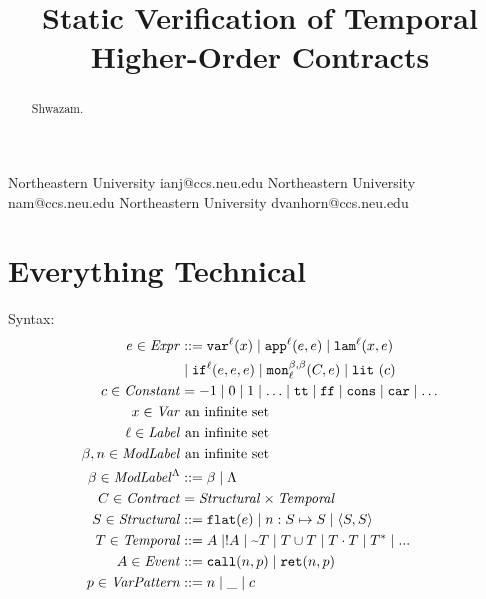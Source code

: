 \documentclass[preprint,onecolumn,9pt]{sigplanconf} %
\begin{document}
\copyrightdata{[to be supplied]}
\title{Static Verification of Temporal Higher-Order Contracts}

           {Northeastern University}
           {ianj@ccs.neu.edu}
           {Northeastern University}
           {nam@ccs.neu.edu}
           {Northeastern University}
           {dvanhorn@ccs.neu.edu}
\maketitle
\begin{abstract}
  Shwazam.
\end{abstract}

\section{Everything Technical}
Syntax:
\begin{align*}
\mexp \in \Expr &::=
      \svar[^\mlab]{\mvar}
 \alt \sapp[^\mlab]{\mexp}{\mexp}
 \alt \slam[^\mlab]{\mvar}{\mexp} \\
&\alt \sif[^\mlab]{\mexp}{\mexp}{\mexp} 
 \alt \sMon{\mmlab}{\mmlab}{\mlab}{\mcontract, \mexp}
 \alt \slit{\mconstant} \\
\mconstant \in \Constant &= -1 \alt 0 \alt 1 \alt \ldots \alt \strue \alt \sfalse \alt \scons \alt \scar \alt \ldots \\
\mvar \in \Var &\text{ an infinite set} \\
\mlab \in \Label &\text{ an infinite set} \\
\mmlab,\mname \in \ModuleLabel &\text{ an infinite set} \\
\msmlab \in \ModuleLabel^{\toplevel} &::= \mmlab \alt \toplevel \\
\mcontract \in \Contract &= \SContract \times \TContract \\
\mscon \in \SContract &::= \sflat{\mexp} \alt \sarr{\mname}{\mscon}{\mscon} \alt \sconsc{\mscon}{\mscon} \\
\mtcon \in \TContract &::=
      \mevent
 \alt \snonevent{\mevent}
 \alt \stnot{\mtcon}
 \alt \stOr{\mtcon}{\mtcon}
 \alt \stseq{\mtcon}{\mtcon}
 \alt \stmany{\mtcon}
 \alt \sddd \\
\mevent \in \Event &::= \scallev{\mname}{\mvpat} \alt \sretev{\mname}{\mvpat} \\
\mvpat \in \VPat &::= \mname \alt \swc \alt \mconstant
\end{align*}
\end{document}
